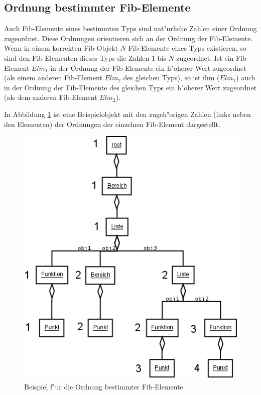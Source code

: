 \subsection{Ordnung bestimmter Fib-Elemente}

Auch Fib-Elemente eines bestimmten Typs sind nat"urliche Zahlen einer Ordnung zugeordnet. Diese Ordnungen orientieren sich an der Ordnung der Fib-Elemente. Wenn in einem korrekten Fib-Objekt $N$ Fib-Elemente eines Typs existieren, so sind den Fib-Elementen dieses Typs die Zahlen $1$ bis $N$ zugeordnet. Ist ein Fib-Element $Elm_1$ in der Ordnung der Fib-Elemente ein h"oherer Wert zugeordnet (als einem anderen Fib-Element $Elm_2$ des gleichen Typs), so ist ihm ($Elm_1$) auch in der Ordnung der Fib-Elemente des gleichen Typs ein h"oherer Wert zugeordnet (als dem anderen Fib-Element $Elm_2$).

In Abbildung \ref{figOrderSpecialFibElements} ist eine Beispielobjekt mit den zugeh"origen Zahlen (links neben den Elementen) der Ordnungen der einzelnen Fib-Element dargestellt.

\begin{figure}[htbp]
\begin{center}
  \includegraphics[scale=0.5]{order_special_elements}
\end{center}
\caption{Beispiel f"ur die Ordnung bestimmter Fib-Elemente}
\label{figOrderSpecialFibElements}
\end{figure}


